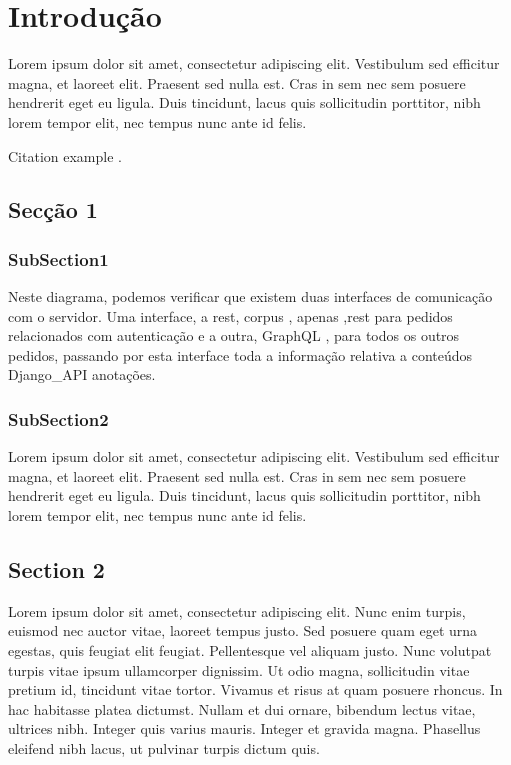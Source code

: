 \chapter{Introdução}

Lorem ipsum dolor sit amet, consectetur adipiscing elit. Vestibulum sed efficitur magna, et laoreet elit. Praesent sed nulla est. Cras in sem nec sem posuere hendrerit eget eu ligula. Duis tincidunt, lacus quis sollicitudin porttitor, nibh lorem tempor elit, nec tempus nunc ante id felis.

Citation example \cite{oppenheimer_why_2003}. 




\section{Secção 1}
\label{subsec:sec1}


\subsection{SubSection1}

Neste diagrama, podemos verificar que existem duas interfaces de comunicação com o servidor. Uma interface, a \gls{rest}, \gls{corpus} , apenas ,\acrshort{rest} para pedidos relacionados com autenticação e a outra, GraphQL , para todos os outros pedidos, passando por esta interface toda a informação relativa a conteúdos  \gls{Django_API} anotações.\\

\subsection{SubSection2}

Lorem ipsum dolor sit amet, consectetur adipiscing elit. Vestibulum sed efficitur magna, et laoreet elit. Praesent sed nulla est. Cras in sem nec sem posuere hendrerit eget eu ligula. Duis tincidunt, lacus quis sollicitudin porttitor, nibh lorem tempor elit, nec tempus nunc ante id felis.

\section{Section 2}
\label{subsec:sec2}

Lorem ipsum dolor sit amet, consectetur adipiscing elit. Nunc enim turpis, euismod nec auctor vitae, laoreet tempus justo. Sed posuere quam eget urna egestas, quis feugiat elit feugiat. Pellentesque vel aliquam justo. Nunc volutpat turpis vitae ipsum ullamcorper dignissim. Ut odio magna, sollicitudin vitae pretium id, tincidunt vitae tortor. Vivamus et risus at quam posuere rhoncus. In hac habitasse platea dictumst. Nullam et dui ornare, bibendum lectus vitae, ultrices nibh. Integer quis varius mauris. Integer et gravida magna. Phasellus eleifend nibh lacus, ut pulvinar turpis dictum quis.

